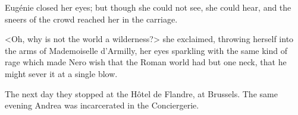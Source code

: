  Eugénie closed her eyes; but though she could not see, she could hear, and the sneers of the crowd reached her in the carriage. 

 <Oh, why is not the world a wilderness?> she exclaimed, throwing herself into the arms of Mademoiselle d'Armilly, her eyes sparkling with the same kind of rage which made Nero wish that the Roman world had but one neck, that he might sever it at a single blow. 

 The next day they stopped at the Hôtel de Flandre, at Brussels. The same evening Andrea was incarcerated in the Conciergerie. 